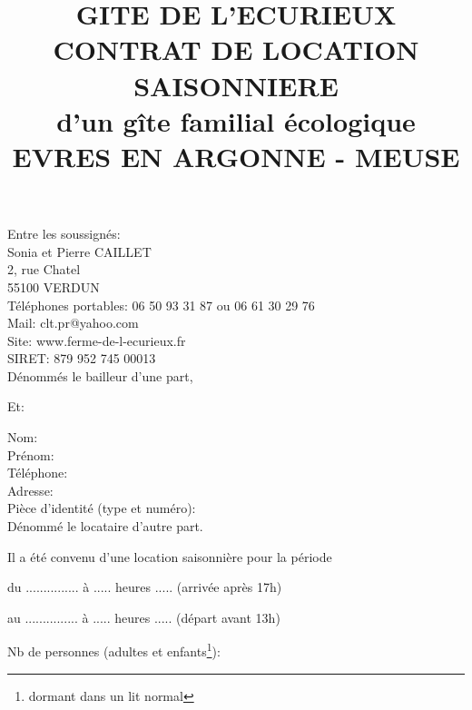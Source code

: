 \documentclass[a4paper,11pt]{article}
\title{GITE DE L'ECURIEUX\\CONTRAT DE LOCATION SAISONNIERE\\d’un gîte familial écologique\\EVRES EN ARGONNE - MEUSE}
\begin{document}
\date{}
\maketitle

\center Entre les soussignés:\\
\flushleft 
Sonia et Pierre CAILLET\\
2, rue Chatel\\
55100 VERDUN\\                                                                                         
Téléphones portables: 06 50 93 31 87 ou 06 61 30 29 76 \\
Mail: clt.pr@yahoo.com\\
Site: www.ferme-de-l-ecurieux.fr\\
SIRET: 879 952 745 00013\\


\vspace{0.5cm}
Dénommés le bailleur d’une part,                            

\center Et:

\flushleft
Nom:\\
Prénom:\\
Téléphone:\\
Adresse:\\
Pièce d'identité (type et numéro):\\

\vspace{0.5cm}
Dénommé le locataire d'autre part.



\flushleft
Il a été convenu d'une location saisonnière pour la période
\vspace{0.5cm}

du   ...............   à .....    heures .....    (arrivée après 17h)
\vspace{0.5cm}

au   ...............   à .....    heures .....   (départ avant 13h)
\vspace{0.5cm}

Nb de personnes (adultes et enfants\footnote{dormant dans un lit normal}): 
\vspace{0.5cm}

\newpage{}




\vspace{0.5cm}
\end{document}
